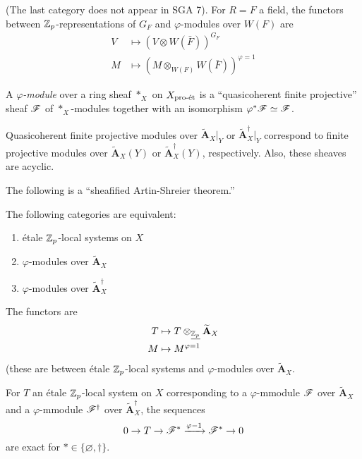 (The last category does not appear in SGA 7). For $R=F$ a field, the functors between 
$\mathbb{Z}_p$-representations of $G_F$ and $\varphi$-modules over $W(F)$ are 
\begin{align*}
  V &\mapsto (V\otimes W(\bar F))^{G_F} \\
  M &\mapsto (M\otimes_{W(F)} W(\bar F))^{\varphi=1} 
\end{align*}

A \emph{$\varphi$-module} over a ring sheaf $\ast_X$ on $X_{\textnormal{pro-\'et}}$ is a ``quasicoherent 
finite projective'' sheaf $\mathscr{F}$ of $\ast_X$-modules together with an isomorphism 
$\varphi^\ast \mathscr{F}\simeq \mathscr{F}$. 

\begin{proposition}
Quasicoherent finite projective modules over $\widetilde{\mathbf A}_X|_Y$ or 
$\widetilde{\mathbf A}_X^\dagger|_Y$ correspond to finite projective modules 
over $\widetilde{\mathbf A}_X(Y)$ or $\widetilde{\mathbf A}_X^\dagger(Y)$, 
respectively. Also, these sheaves are acyclic. 
\end{proposition}

The following is a ``sheafified Artin-Shreier theorem.'' 

\begin{theorem}
The following categories are equivalent:
\begin{enumerate}
  \item \'etale $\mathbb{Z}_p$-local systems on $X$
  \item $\varphi$-modules over $\widetilde{\mathbf A}_X$
  \item $\varphi$-modules over $\widetilde{\mathbf A}_X^\dagger$
\end{enumerate}
\end{theorem}
The functors are 
\begin{align*}
  T &\mapsto T\otimes_{\underline{\mathbb{Z}_p}} \widetilde{\mathbf A}_X \\
  M &\mapsto M^{\varphi=1} 
\end{align*}
(these are between \'etale $\mathbb{Z}_p$-local systems and $\varphi$-modules over 
$\widetilde{\mathbf A}_X$. 

\begin{theorem}
For $T$ an \'etale $\mathbb{Z}_p$-local system on $X$ corresponding to a $\varphi$-mmodule 
$\mathscr{F}$ over $\widetilde{\mathbf A}_X$ and a $\varphi$-mmodule $\mathscr{F}^\dagger$ over 
$\widetilde{\mathbf A}_X^\dagger$, the sequences 
\[
  0 \to T \to \mathscr{F}^\ast \xrightarrow{\varphi-1} \mathscr{F}^\ast \to 0 
\]
are exact for $\ast\in \{\varnothing,\dagger\}$. 
\end{theorem}

